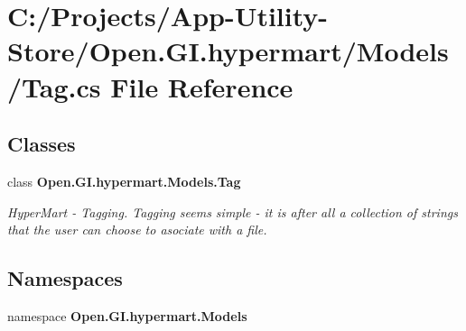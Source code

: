 \section{C\+:/\+Projects/\+App-\/\+Utility-\/\+Store/\+Open.G\+I.\+hypermart/\+Models/\+Tag.cs File Reference}
\label{_tag_8cs}
\subsection*{Classes}
\begin{DoxyCompactItemize}
\item 
class \textbf{ Open.\+G\+I.\+hypermart.\+Models.\+Tag}
\begin{DoxyCompactList}\small\item\em Hyper\+Mart -\/ Tagging. Tagging seems simple -\/ it is after all a collection of strings that the user can choose to asociate with a file. \end{DoxyCompactList}\end{DoxyCompactItemize}
\subsection*{Namespaces}
\begin{DoxyCompactItemize}
\item 
namespace \textbf{ Open.\+G\+I.\+hypermart.\+Models}
\end{DoxyCompactItemize}
